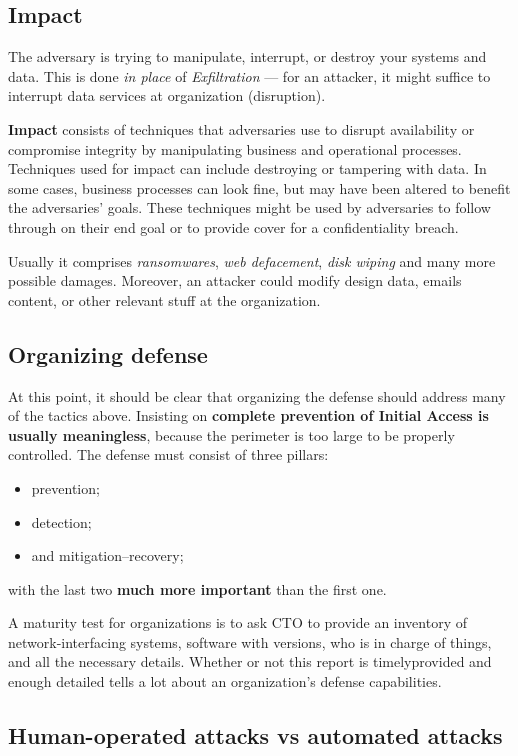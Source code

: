 \documentclass[10pt]{\classname}
\begin{document}
\subsection{Impact}

The adversary is trying to manipulate, interrupt, or destroy your systems and
data. This is done \emph{in place} of \emph{Exfiltration} --- for an attacker,
it might suffice to interrupt data services at organization (disruption).

\textbf{Impact} consists of techniques that adversaries use to disrupt
availability or compromise integrity by manipulating business and operational
processes. Techniques used for impact can include destroying or tampering with
data. In some cases, business processes can look fine, but may have been
altered to benefit the adversaries’ goals. These techniques might be used by
adversaries to follow through on their end goal or to provide cover for a
confidentiality breach.

Usually it comprises \emph{ransomwares}, \emph{web defacement}, \emph{disk
wiping} and many more possible damages. Moreover, an attacker could modify
design data, emails content, or other relevant stuff at the organization.

\subsection{Organizing defense}

At this point, it should be clear that organizing the defense should address
many of the tactics above. Insisting on \textbf{complete prevention of Initial
Access is usually meaningless}, because the perimeter is too large to be
properly controlled. The defense must consist of three pillars:
\begin{itemize}
    \item prevention;
    \item detection;
    \item and mitigation\---recovery;
\end{itemize}
with the last two \textbf{much more important} than the first one.

A maturity test for organizations is to ask CTO to provide an inventory of
network\--interfacing systems, software with versions, who is in charge of
things, and all the necessary details. Whether or not this report is
timely\textendash{}provided and enough detailed tells a lot about an
organization's defense capabilities.

\subsection{Human\--operated attacks vs automated attacks}
\end{document}
